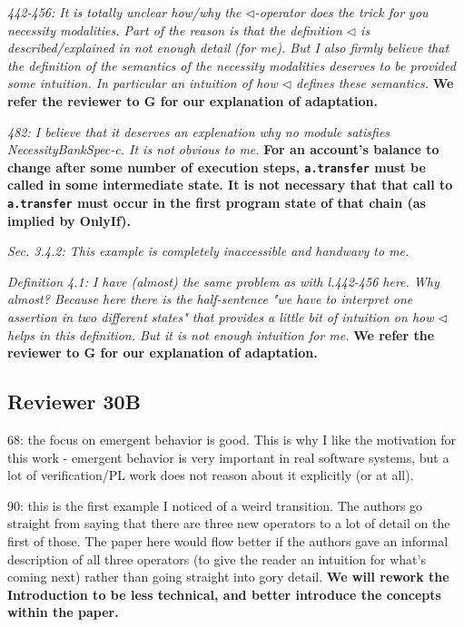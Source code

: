 \documentclass[11pt]{amsart}
\newcommand{\rev}[1]{\emph #1}
\newcommand{\us}[1]{\bf #1}
\begin{document}
{\rev {{442-456: It is totally unclear how/why the $\triangleleft$-operator does the trick for you necessity modalities. Part of the reason is that the definition $\triangleleft$ is described/explained in not enough detail (for me). But I also firmly believe that the definition of the semantics of the necessity modalities deserves to be provided some intuition. In particular an intuition of how $ \triangleleft$ defines these semantics. }}}
{\us{We refer the reviewer to G for our explanation of adaptation.}}

{\rev {{482: I believe that it deserves an explenation why no module satisfies NecessityBankSpec-c. It is not obvious to me. }}}
{\us{For an account's balance to change after some number of execution steps, \texttt{a.transfer} must be called in some intermediate state.
It is not necessary that that call to \texttt{a.transfer} must occur in the first program state of that chain (as implied by OnlyIf).}}

{\rev {{Sec. 3.4.2: This example is completely inaccessible and handwavy to me. }}}

{\rev {{ Definition 4.1: I have (almost) the same problem as with l.442-456 here. Why almost? Because here there is the half-sentence "we have to interpret one assertion in two different states" that provides a little bit of intuition on how $\triangleleft$ helps in this definition. But it is not enough intuition for me. }}}
{\us{We refer the reviewer to G for our explanation of adaptation.}}

   
  \subsection*{Reviewer 30B}
  
   68: the focus on emergent behavior is good. This is why I like the motivation for this work - emergent behavior is very important in real software systems, but a lot of verification/PL work does not reason about it explicitly (or at all).

90: this is the first example I noticed of a weird transition. The authors go straight from saying that there are three new operators to a lot of detail on the first of those. The paper here would flow better if the authors gave an informal description of all three operators (to give the reader an intuition for what’s coming next) rather than going straight into gory detail.
{\us{We will rework the Introduction to be less technical, and better introduce the concepts within the paper.}}
\end{document}
